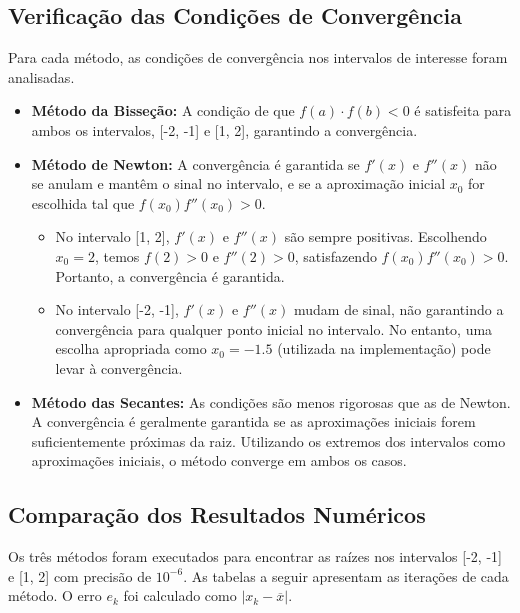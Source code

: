 \documentclass[12pt, a4paper]{article}
\begin{document}
\subsection*{Verificação das Condições de Convergência}
Para cada método, as condições de convergência nos intervalos de interesse foram analisadas.
\begin{itemize}
    \item \textbf{Método da Bisseção:} A condição de que $f(a) \cdot f(b) < 0$ é satisfeita para ambos os intervalos, [-2, -1] e [1, 2], garantindo a convergência.
    \item \textbf{Método de Newton:} A convergência é garantida se $f'(x)$ e $f''(x)$ não se anulam e mantêm o sinal no intervalo, e se a aproximação inicial $x_0$ for escolhida tal que $f(x_0)f''(x_0)>0$.
    \begin{itemize}
        \item No intervalo [1, 2], $f'(x)$ e $f''(x)$ são sempre positivas. Escolhendo $x_0=2$, temos $f(2)>0$ e $f''(2)>0$, satisfazendo $f(x_0)f''(x_0)>0$. Portanto, a convergência é garantida.
        \item No intervalo [-2, -1], $f'(x)$ e $f''(x)$ mudam de sinal, não garantindo a convergência para qualquer ponto inicial no intervalo. No entanto, uma escolha apropriada como $x_0 = -1.5$ (utilizada na implementação) pode levar à convergência.
    \end{itemize}
    \item \textbf{Método das Secantes:} As condições são menos rigorosas que as de Newton. A convergência é geralmente garantida se as aproximações iniciais forem suficientemente próximas da raiz. Utilizando os extremos dos intervalos como aproximações iniciais, o método converge em ambos os casos.
\end{itemize}

\subsection*{Comparação dos Resultados Numéricos}
Os três métodos foram executados para encontrar as raízes nos intervalos [-2, -1] e [1, 2] com precisão de $10^{-6}$. As tabelas a seguir apresentam as iterações de cada método. O erro $e_k$ foi calculado como $|x_k - \overline{x}|$.
\end{document}
